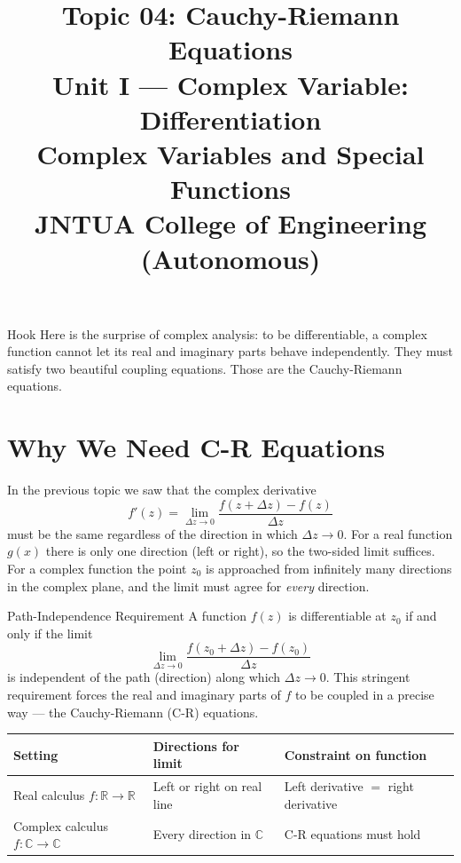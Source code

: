 \documentclass[12pt,a4paper]{article}
\title{\textbf{Topic 04: Cauchy-Riemann Equations}\\
\large Unit I --- Complex Variable: Differentiation\\
Complex Variables and Special Functions\\
JNTUA College of Engineering (Autonomous)}
\date{}
\begin{document}
\maketitle
\tableofcontents
\newpage

\begin{curiositybox}{Hook}
Here is the surprise of complex analysis: to be differentiable, a complex function cannot let its real and imaginary parts behave independently. They must satisfy two beautiful coupling equations. Those are the Cauchy-Riemann equations.
\end{curiositybox}

\section{Why We Need C-R Equations}

In the previous topic we saw that the complex derivative
\[
  f'(z) = \lim_{\Delta z \to 0} \frac{f(z+\Delta z)-f(z)}{\Delta z}
\]
must be the same regardless of the direction in which $\Delta z \to 0$.
For a real function $g(x)$ there is only one direction (left or right), so the two-sided limit suffices.
For a complex function the point $z_0$ is approached from infinitely many directions in the complex plane, and the limit must agree for \emph{every} direction.

\begin{infobox}{Path-Independence Requirement}
A function $f(z)$ is differentiable at $z_0$ if and only if the limit
\[
  \lim_{\Delta z \to 0} \frac{f(z_0+\Delta z)-f(z_0)}{\Delta z}
\]
is independent of the path (direction) along which $\Delta z \to 0$.
This stringent requirement forces the real and imaginary parts of $f$ to be coupled in a precise way --- the Cauchy-Riemann (C-R) equations.
\end{infobox}

\medskip

\begin{center}
\begin{tabular}{lll}
\toprule
\textbf{Setting} & \textbf{Directions for limit} & \textbf{Constraint on function} \\
\midrule
Real calculus $f:\mathbb{R}\to\mathbb{R}$ & Left or right on real line & Left derivative $=$ right derivative \\
Complex calculus $f:\mathbb{C}\to\mathbb{C}$ & Every direction in $\mathbb{C}$ & C-R equations must hold \\
\bottomrule
\end{tabular}
\end{center}
\end{document}
